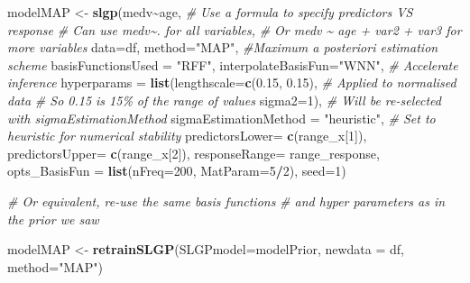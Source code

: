 \documentclass[
]{article}
\newenvironment{Shaded}{\begin{snugshade}}{\end{snugshade}}
\newcommand{\AttributeTok}[1]{\textcolor[rgb]{0.13,0.29,0.53}{#1}}
\newcommand{\CommentTok}[1]{\textcolor[rgb]{0.56,0.35,0.01}{\textit{#1}}}
\newcommand{\DecValTok}[1]{\textcolor[rgb]{0.00,0.00,0.81}{#1}}
\newcommand{\FloatTok}[1]{\textcolor[rgb]{0.00,0.00,0.81}{#1}}
\newcommand{\FunctionTok}[1]{\textcolor[rgb]{0.13,0.29,0.53}{\textbf{#1}}}
\newcommand{\NormalTok}[1]{#1}
\newcommand{\OtherTok}[1]{\textcolor[rgb]{0.56,0.35,0.01}{#1}}
\newcommand{\SpecialCharTok}[1]{\textcolor[rgb]{0.81,0.36,0.00}{\textbf{#1}}}
\newcommand{\StringTok}[1]{\textcolor[rgb]{0.31,0.60,0.02}{#1}}
\begin{document}
\begin{Shaded}
\begin{Highlighting}[]
\NormalTok{modelMAP }\OtherTok{\textless{}{-}} \FunctionTok{slgp}\NormalTok{(medv}\SpecialCharTok{\textasciitilde{}}\NormalTok{age, }\CommentTok{\# Use a formula to specify predictors VS response}
                 \CommentTok{\# Can use medv\textasciitilde{}. for all variables,}
                 \CommentTok{\# Or medv \textasciitilde{} age + var2 + var3 for more variables}
                 \AttributeTok{data=}\NormalTok{df,}
                 \AttributeTok{method=}\StringTok{"MAP"}\NormalTok{, }\CommentTok{\#Maximum a posteriori estimation scheme}
                 \AttributeTok{basisFunctionsUsed =} \StringTok{"RFF"}\NormalTok{,}
                 \AttributeTok{interpolateBasisFun=}\StringTok{"WNN"}\NormalTok{, }\CommentTok{\# Accelerate inference}
                 \AttributeTok{hyperparams =} \FunctionTok{list}\NormalTok{(}\AttributeTok{lengthscale=}\FunctionTok{c}\NormalTok{(}\FloatTok{0.15}\NormalTok{, }\FloatTok{0.15}\NormalTok{), }
                                    \CommentTok{\# Applied to normalised data}
                                    \CommentTok{\# So 0.15 is 15\% of the range of values}
                                    \AttributeTok{sigma2=}\DecValTok{1}\NormalTok{), }
                 \CommentTok{\# Will be re{-}selected with sigmaEstimationMethod}
                 \AttributeTok{sigmaEstimationMethod =} \StringTok{"heuristic"}\NormalTok{, }
                 \CommentTok{\# Set to heuristic for numerical stability                 }
                 \AttributeTok{predictorsLower=} \FunctionTok{c}\NormalTok{(range\_x[}\DecValTok{1}\NormalTok{]),}
                 \AttributeTok{predictorsUpper=} \FunctionTok{c}\NormalTok{(range\_x[}\DecValTok{2}\NormalTok{]),}
                 \AttributeTok{responseRange=}\NormalTok{ range\_response,}
                 \AttributeTok{opts\_BasisFun =} \FunctionTok{list}\NormalTok{(}\AttributeTok{nFreq=}\DecValTok{200}\NormalTok{,}
                                      \AttributeTok{MatParam=}\DecValTok{5}\SpecialCharTok{/}\DecValTok{2}\NormalTok{),}
                 \AttributeTok{seed=}\DecValTok{1}\NormalTok{)}
\end{Highlighting}
\end{Shaded}

\begin{Shaded}
\begin{Highlighting}[]
\CommentTok{\# Or equivalent, re{-}use the same basis functions }
\CommentTok{\# and hyper parameters as in the prior we saw}

\NormalTok{modelMAP }\OtherTok{\textless{}{-}} \FunctionTok{retrainSLGP}\NormalTok{(}\AttributeTok{SLGPmodel=}\NormalTok{modelPrior, }
                        \AttributeTok{newdata =}\NormalTok{ df, }
                        \AttributeTok{method=}\StringTok{"MAP"}\NormalTok{)}
\end{Highlighting}
\end{Shaded}
\end{document}
